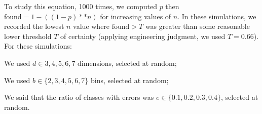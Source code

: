     To study this equation, 1000 times, we computed $p$ then $\textrm{found}=1-((1-p)**n)$ for increasing values of $n$.
    In these simulations, we recorded the lowest $n$ value where $\textrm{found}>T$ was greater than some reasonable lower threshold $T$
    of certainty
    (applying engineering judgment, we used $T=0.66$). For these simulations:
    \bi
  \item We used $d \in {3,4,5,6,7}$ dimensions, selected at random;
  \item We used $b \in \{2,3,4,5,6,7\}$ bins, selected at random;
    \item We said that the ratio of classes with errors was $e\in \{0.1,0.2,0.3,0.4\}$, selected at random.
    \ei
